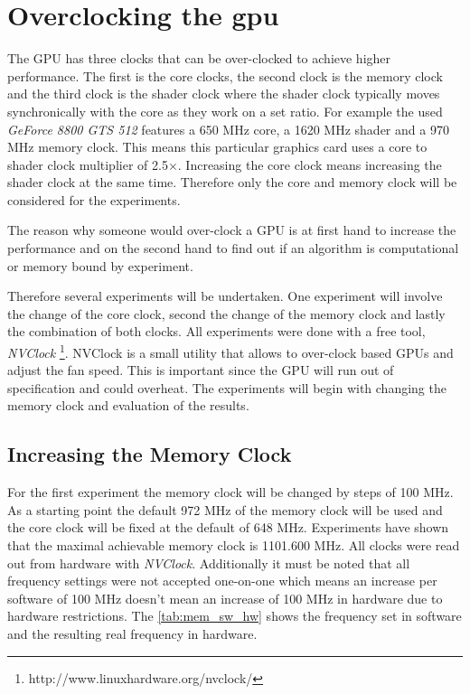
\section{Overclocking the gpu} %
\label{sec:overclocking_the_gpu}
The \gls{GPU} has three \glspl{clock} that can be over-clocked to achieve higher
performance. The first is the core \glspl{clock}, the second \gls{clock} is
the memory clock and the third clock is the \gls{shader} \gls{clock} where the
shader clock typically moves synchronically with the core as they work on a set
ratio. For example the used \emph{GeForce 8800 GTS 512} features a 650 \gls{MHz}
core, a 1620 \gls{MHz} shader and a 970 \gls{MHz} memory clock. This means this
particular graphics card uses a core to shader \gls{clock} multiplier of
2.5$\times$. Increasing the core \gls{clock} means increasing the shader clock
at the same time. Therefore only the core and memory clock will be considered
for the experiments.

The reason why someone would over-clock a \gls{GPU} is at first hand to increase
the performance and on the second hand to find out if an algorithm is
computational or memory bound by experiment.

Therefore several experiments will be undertaken. One experiment will involve
the change of the core \gls{clock}, second the change of the memory \gls{clock}
and lastly the combination of both \glspl{clock}. All experiments were done with
a free tool, \emph{NVClock}
\footnote{http://www.linuxhardware.org/nvclock/}. NVClock is a small utility
that allows to over-clock {} based \glspl{GPU} and adjust the fan speed. This
is important since the \gls{GPU} will run out of specification and could overheat.
The experiments will begin with changing the memory clock and evaluation of the
results. 


\subsection{Increasing the Memory Clock} %
\label{sub:increasing_the_memory_clcok}
For the first experiment the memory clock will be changed by steps of 100 \gls{MHz}.
As a starting point the default 972 \gls{MHz} of the memory clock will be used 
and the core clock will be fixed at the default of 648 \gls{MHz}. Experiments 
have shown that the maximal achievable memory clock is 1101.600 \gls{MHz}. 
All clocks were read out from hardware with \emph{NVClock}. Additionally it must
be noted that all frequency settings were not accepted one-on-one which means an 
increase per software of 100 \gls{MHz} doesn't mean an increase of 100 \gls{MHz}
in hardware due to hardware restrictions. The \autoref{tab:mem_sw_hw} shows the 
frequency set in software and the resulting real frequency in hardware. 

